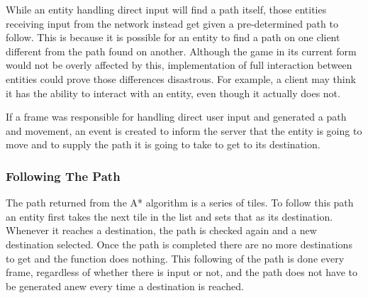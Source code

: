 While an entity handling direct input will find a path itself, those entities receiving input from the network instead get given a pre-determined path to follow. This is because it is possible for an entity to find a path on one client different from the path found on another. Although the game in its current form would not be overly affected by this, implementation of full interaction between entities could prove those differences disastrous. For example, a client may think it has the ability to interact with an entity, even though it actually does not.

If a frame was responsible for handling direct user input and generated a path and movement, an event is created to inform the server that the entity is going to move and to supply the path it is going to take to get to its destination.


\subsubsection{Following The Path}
The path returned from the A* algorithm is a series of tiles. To follow this path an entity first takes the next tile in the list and sets that as its destination. Whenever it reaches a destination, the path is checked again and a new destination selected. Once the path is completed there are no more destinations to get and the function does nothing. This following of the path is done every frame, regardless of whether there is input or not, and the path does not have to be generated anew every time a destination is reached.

